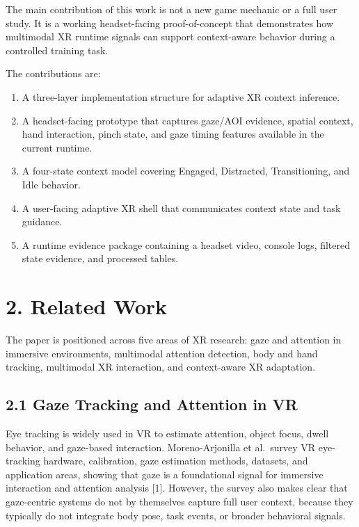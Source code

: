\documentclass[
  10pt,
]{article}
\providecommand{\tightlist}{%
  \setlength{\itemsep}{0pt}\setlength{\parskip}{0pt}}
\begin{document}
The main contribution of this work is not a new game mechanic or a full
user study. It is a working headset-facing proof-of-concept that
demonstrates how multimodal XR runtime signals can support context-aware
behavior during a controlled training task.

The contributions are:

\begin{enumerate}
\def\labelenumi{\arabic{enumi}.}
\tightlist
\item
  A three-layer implementation structure for adaptive XR context
  inference.
\item
  A headset-facing prototype that captures gaze/AOI evidence, spatial
  context, hand interaction, pinch state, and gaze timing features
  available in the current runtime.
\item
  A four-state context model covering Engaged, Distracted,
  Transitioning, and Idle behavior.
\item
  A user-facing adaptive XR shell that communicates context state and
  task guidance.
\item
  A runtime evidence package containing a headset video, console logs,
  filtered state evidence, and processed tables.
\end{enumerate}

\section{2. Related Work}\label{related-work}

The paper is positioned across five areas of XR research: gaze and
attention in immersive environments, multimodal attention detection,
body and hand tracking, multimodal XR interaction, and context-aware XR
adaptation.

\subsection{2.1 Gaze Tracking and Attention in
VR}\label{gaze-tracking-and-attention-in-vr}

Eye tracking is widely used in VR to estimate attention, object focus,
dwell behavior, and gaze-based interaction. Moreno-Arjonilla et
al.~survey VR eye-tracking hardware, calibration, gaze estimation
methods, datasets, and application areas, showing that gaze is a
foundational signal for immersive interaction and attention analysis
{[}1{]}. However, the survey also makes clear that gaze-centric systems
do not by themselves capture full user context, because they typically
do not integrate body pose, task events, or broader behavioral signals.
\end{document}
